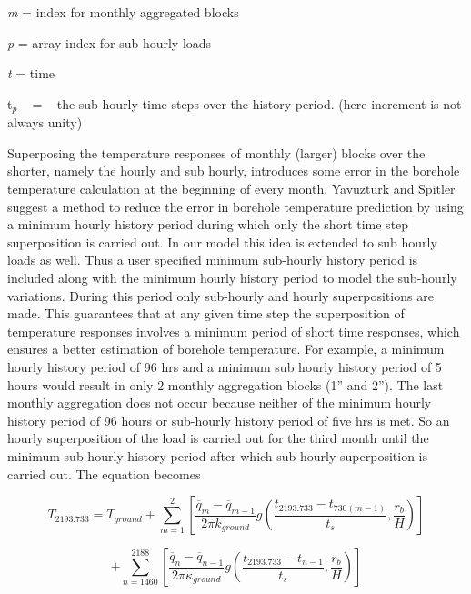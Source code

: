 \emph{m} = index for monthly aggregated blocks

\emph{p} = array index for sub hourly loads

\emph{t} = time

t\(_{p}\) ~ = ~ the sub hourly time steps over the history period. (here increment is not always unity)

Superposing the temperature responses of monthly (larger) blocks over the shorter, namely the hourly and sub hourly, introduces some error in the borehole temperature calculation at the beginning of every month. Yavuzturk and Spitler suggest a method to reduce the error in borehole temperature prediction by using a minimum hourly history period during which only the short time step superposition is carried out. In our model this idea is extended to sub hourly loads as well. Thus a user specified minimum sub-hourly history period is included along with the minimum hourly history period to model the sub-hourly variations. During this period only sub-hourly and hourly superpositions are made. This guarantees that at any given time step the superposition of temperature responses involves a minimum period of short time responses, which ensures a better estimation of borehole temperature. For example, a minimum hourly history period of 96 hrs and a minimum sub hourly history period of 5 hours would result in only 2 monthly aggregation blocks (1'' and 2''). The last monthly aggregation does not occur because neither of the minimum hourly history period of 96 hours or sub-hourly history period of five hrs is met. So an hourly superposition of the load is carried out for the third month until the minimum sub-hourly history period after which sub hourly superposition is carried out. The equation becomes

\begin{equation}
{T_{2193.733}} = {T_{ground}} + \sum\limits_{m = 1}^2 {\left[ {\frac{{{{\overline{\overline q} }_m} - {{\overline{\overline q} }_{m - 1}}}}{{2\pi {k_{ground}}}}g\left( {\frac{{{t_{2193.733}} - {t_{730(m - 1)}}}}{{{t_s}}},\frac{{{r_b}}}{H}} \right)} \right]}
\end{equation}

\begin{equation}
+ \sum\limits_{n = 1460}^{2188} {\left[ {\frac{{{{\overline q }_n} - {{\overline q }_{n - 1}}}}{{2\pi {\kappa_{ground}}}}g\left( {\frac{{{t_{2193.733}} - {t_{n - 1}}}}{{{t_s}}},\frac{{{r_b}}}{H}} \right)} \right]}
\end{equation}

